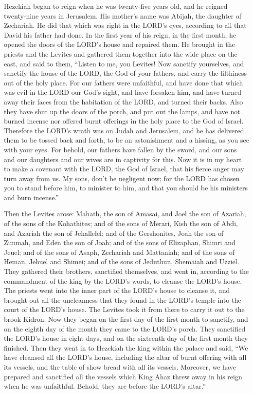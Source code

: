 \mychapter{} \myverse*{}Hezekiah began to reign when he was twenty-five years old, and
he reigned twenty-nine years in Jerusalem. His mother’s name was Abijah, the daughter of Zechariah.
\myverse{}He did that which was right in the LORD’s eyes, according to all that David
his father had done.
\myverse{}In the first year of his reign, in the first month, he opened the doors of
the LORD’s house and repaired them.
\myverse{}He brought in the priests and the Levites and gathered them together into the
wide place on the east,
\myverse{}and said to them, “Listen to me, you Levites! Now sanctify yourselves, and
sanctify the house of the LORD, the God of your fathers, and carry the filthiness out of the holy place.
\myverse{}For our fathers were unfaithful, and have done that which was evil in the LORD
our God’s sight, and have forsaken him, and have turned away their faces from the habitation of the LORD,
and turned their backs.
\myverse{}Also they have shut up the doors of the porch, and put out the lamps, and have
not burned incense nor offered burnt offerings in the holy place to the God of Israel.
\myverse{}Therefore the LORD’s wrath was on Judah and Jerusalem, and he has delivered
them to be tossed back and forth, to be an astonishment and a hissing, as you see with your eyes.
\myverse{}For behold, our fathers have fallen by the sword, and our sons and our daughters
and our wives are in captivity for this.
\myverse{}Now it is in my heart to make a covenant with the LORD, the God of Israel,
that his fierce anger may turn away from us.
\myverse{}My sons, don’t be negligent now; for the LORD has chosen you to stand before
him, to minister to him, and that you should be his ministers and burn incense.”

\myverse{}Then the Levites arose: Mahath, the son of Amasai, and Joel
the son of Azariah, of the sons of the Kohathites; and of the sons of Merari, Kish the son of Abdi, and
Azariah the son of Jehallelel; and of the Gershonites, Joah the son of Zimmah, and Eden the son of Joah;
\myverse{}and of the sons of Elizaphan, Shimri and Jeuel; and of the sons of Asaph,
Zechariah and Mattaniah;
\myverse{}and of the sons of Heman, Jehuel and Shimei; and of the sons of Jeduthun,
Shemaiah and Uzziel.
\myverse{}They gathered their brothers, sanctified themselves, and went in, according
to the commandment of the king by the LORD’s words, to cleanse the LORD’s house.
\myverse{}The priests went into the inner part of the LORD’s house to cleanse it, and
brought out all the uncleanness that they found in the LORD’s temple into the court of the LORD’s house.
The Levites took it from there to carry it out to the brook Kidron.
\myverse{}Now they began on the first day of the first month to sanctify, and on the
eighth day of the month they came to the LORD’s porch. They sanctified the LORD’s house in eight days,
and on the sixteenth day of the first month they finished.
\myverse{}Then they went in to Hezekiah the king within the palace and said, “We have
cleansed all the LORD’s house, including the altar of burnt offering with all its vessels, and the table
of show bread with all its vessels.
\myverse{}Moreover, we have prepared and sanctified all the vessels which King Ahaz
threw away in his reign when he was unfaithful. Behold, they are before the LORD’s altar.”

